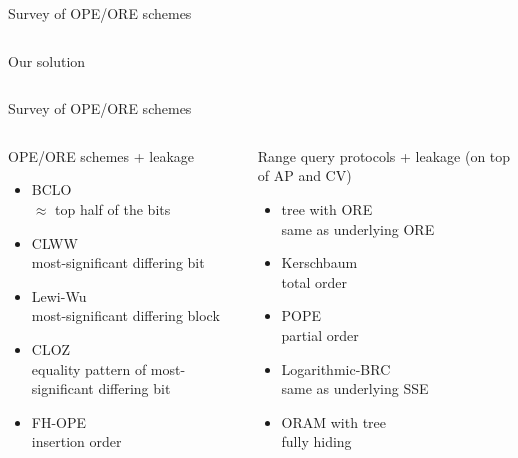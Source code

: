 \begin{frame}{Survey of OPE/ORE schemes~\cite{ore-benchmark-17}}
\begin{columns}[T,onlytextwidth]
{\begin{block}{Our solution}
						\end{block}
					}

			\end{columns}

		\end{frame}

		\begin{frame}{Survey of OPE/ORE schemes~\cite{ore-benchmark-17}}

			\begin{columns}[T,onlytextwidth]

					\begin{block}{OPE/ORE schemes + leakage}

						\begin{itemize}
							\item \normalsize BCLO~\cite{crypt-db-ope} \\ \small{$\approx$ top half of the bits}
							\item \normalsize CLWW~\cite{practical-ore} \\ \small{most-significant differing bit}
							\item \normalsize Lewi-Wu~\cite{lewi-ore} \\ \small{most-significant differing block}
							\item \normalsize CLOZ~\cite{adam-ore-v2} \\ \small{equality pattern of most-significant differing bit}
							\item \normalsize FH-OPE~\cite{fh-ope} \\ \small{insertion order}
						\end{itemize}

					\end{block}


					\begin{block}{Range query protocols + leakage (on top of AP and CV)}

						\begin{itemize}
							\item \normalsize {\BPlus} tree with ORE \\ \small{same as underlying ORE}
							\item \normalsize Kerschbaum~\cite{florian-protocol} \\ \small{total order}
							\item \normalsize POPE~\cite{pope} \\ \small{partial order}
							\item \normalsize Logarithmic-BRC~\cite{practical-range-search} \\ \small{same as underlying SSE}
							\item \normalsize ORAM with {\BPlus} tree \\ \small{fully hiding}
						\end{itemize}


\end{block}
\end{columns}
\end{frame}
